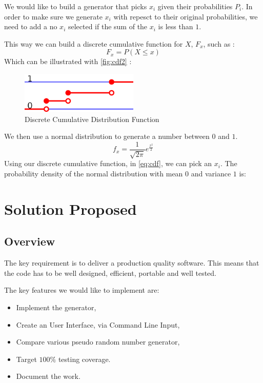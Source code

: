 \documentclass[12pt,a4paper,article]{memoir} %
\begin{document}
We would like to build a generator that picks $x_i$ given their probabilities
$P_i$. 
In order to make sure we generate $x_i$ with repesct to their original probabilities, 
we need to add a no $x_i$ selected if the sum of the $x_i$ is less than $1$.

This way we can build a discrete cumulative function for $X$, $F_x$, such as :
\begin{equation}
	F_x = P\left( X \leq x \right)
	\label{eq:cdf}
\end{equation}
Which can be illustrated with \autoref{fig:cdf2} :
\begin{figure}[h!]
\begin{center}
\includegraphics[width=0.5\textwidth]{img/cdf.png}
\caption{Discrete Cumulative Distribution Function}
\label{fig:cdf2}
\end{center}
\end{figure}

We then use a normal distribution to generate a number between $0$ and $1$.
\[
	f_x = \frac{1}{\sqrt{2 \pi}} e^{\frac{x^2}{2}}
\]
Using our discrete cumulative function, in \autoref{eq:cdf}, we can pick an $x_i$.
The probability density of the normal distribution with mean $0$ and variance $1$ is:

\section{Solution Proposed}
\subsection{Overview}

The key requirement is to deliver a production quality software.
This means that the code has to be well designed, efficient, portable and well tested.

The key features we would like to implement are:
\begin{itemize}
	\item Implement the generator,
	\item Create an User Interface, via Command Line Input,
	\item Compare various pseudo random number generator,
	\item Target $100\%$ testing coverage.
	\item Document the work.
\end{itemize}
\end{document}

